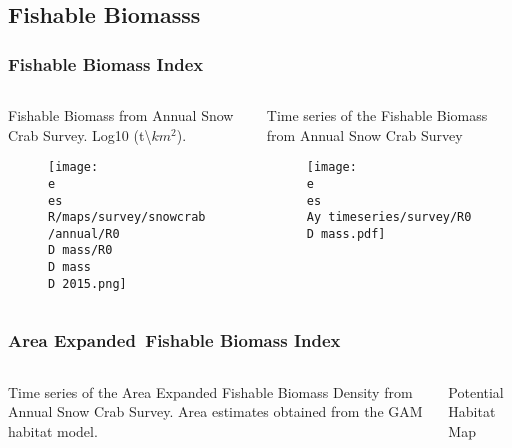 \subsection{Fishable Biomasss}

\begin{frame}
\frametitle{Fishable Biomass Index}
\begin{columns}

\begin{column}{0.5\textwidth}
	\begin{center}
	Fishable Biomass from Annual Snow Crab Survey. Log10 (t\textbackslash$km^2$).\\ 
	\end{center}
	\begin{figure}
		\texttt{[image: \\e \\es R/maps/survey/snowcrab/annual/R0\\D mass/R0\\D mass\\D 2015.png]}
	\end{figure}
\end{column}

\begin{column}{0.5\textwidth}
	\begin{center}
	Time series of the Fishable Biomass from Annual Snow Crab Survey
	\end{center}
\begin{figure}
    \centering
    \texttt{[image: \\e \\es \\Ay timeseries/survey/R0\\D mass.pdf]}
 \end{figure}
\end{column}

\end{columns}
\end{frame}



\begin{frame}
\frametitle{Area Expanded\
Fishable Biomass Index}
\begin{columns}

\begin{column}{0.5\textwidth}
	\begin{center}
	Time series of the Area Expanded Fishable Biomass Density from Annual Snow Crab Survey. Area estimates obtained from the GAM habitat model.
	\end{center}
\end{column}

\begin{column}{0.5\textwidth}
	\begin{center}
	Potential Habitat Map
	\end{center}

	\end{column}
\end{columns}
\end{frame}


